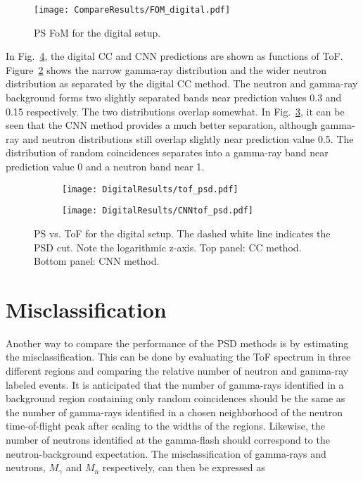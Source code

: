 \documentclass[main.tex]{subfiles}
\begin{document}
\begin{figure}[h!]
	    \centering
    	    \texttt{[image: CompareResults/FOM\_digital.pdf]}
	    \caption[PS FoM for the digital setup.]{PS FoM for the digital setup.}
   	    \label{fig:fom_d} 
\end{figure}

In Fig.~\ref{fig:tof_cc_tof_cnn}, the digital CC and CNN predictions are shown as functions of ToF. Figure~\ref{fig:tof_digi_cc} shows the narrow gamma-ray distribution and the wider neutron distribution as separated by the digital CC method. 
The neutron and gamma-ray background forms two slightly separated bands near prediction values 0.3 and 0.15 respectively. The two distributions overlap somewhat.  
In Fig.~\ref{fig:tof_digi_cnn}, it can be seen that the CNN method provides a much better separation, although gamma-ray and neutron distributions still overlap slightly near prediction value 0.5. The distribution of random coincidences separates into a gamma-ray band near prediction value 0 and a neutron band near 1.


\begin{figure}
    \centering
    \begin{subfigure}[ht]{\textwidth}
    	\centering
        \texttt{[image: DigitalResults/tof\_psd.pdf]}
        \caption{}
        \label{fig:tof_digi_cc}
    \end{subfigure}
	\begin{subfigure}[ht]{\textwidth}
		\centering
        \texttt{[image: DigitalResults/CNNtof\_psd.pdf]}
        \caption{}
        \label{fig:tof_digi_cnn}
    \end{subfigure}
    \caption[PS vs. ToF for the digital setup.]{PS vs. ToF for the digital setup. The dashed white line indicates the PSD cut. Note the logarithmic z-axis. Top panel: CC method. Bottom panel: CNN method.}
    \label{fig:tof_cc_tof_cnn}
\end{figure}


\clearpage
\section{Misclassification}\label{sec:comp}


Another way to compare the performance of the PSD methods is by estimating the misclassification. This can be done by evaluating the ToF spectrum in three different regions and comparing the relative number of neutron and gamma-ray labeled events. It is anticipated that the number of gamma-rays identified in a background region containing only random coincidences should be the same as the number of gamma-rays identified in a chosen neighborhood of the neutron time-of-flight peak after scaling to the widths of the regions. Likewise, the number of neutrons identified at the gamma-flash should correspond to the neutron-background expectation. The misclassification of gamma-rays and neutrons, $M_{\gamma}$ and $M_{n}$ respectively, can then be expressed as
\end{document}
